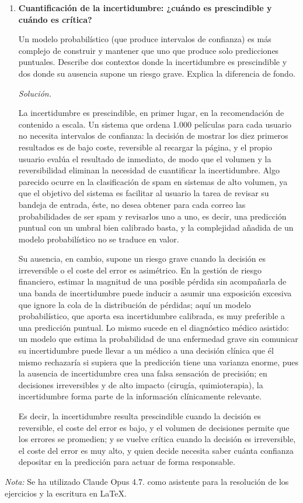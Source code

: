 \documentclass[12pt]{article}
\newcommand\sol[1]{\begin{mdframed}
\emph{Solución.} #1
\end{mdframed}}
\begin{document}
\begin{enumerate}
\item \textbf{Cuantificación de la incertidumbre: ¿cuándo es prescindible y cuándo es crítica?}

Un modelo probabilístico (que produce intervalos de confianza) es más complejo de construir y
mantener que uno que produce solo predicciones puntuales. Describe dos contextos donde la
incertidumbre es prescindible y dos donde su ausencia supone un riesgo grave. Explica la diferencia
de fondo.

\sol{

La incertidumbre es prescindible, en primer lugar, en la recomendación de contenido a escala. Un
sistema que ordena 1.000 películas para cada usuario no necesita intervalos de confianza: la decisión
de mostrar los diez primeros resultados es de bajo coste, reversible al recargar la página, y el
propio usuario evalúa el resultado de inmediato, de modo que el volumen y la reversibilidad eliminan
la necesidad de cuantificar la incertidumbre. Algo parecido ocurre en la clasificación de spam en
sistemas de alto volumen, ya que el objetivo del sistema es facilitar al usuario la tarea de revisar su bandeja de entrada, éste, no desea obtener para cada correo las probabilidades de ser spam y revisarlos uno a uno, es decir, una predicción puntual con un umbral bien calibrado basta, y la complejidad añadida de un modelo probabilístico no se traduce
en valor.

\medskip
Su ausencia, en cambio, supone un riesgo grave cuando la decisión es irreversible o el coste del error
es asimétrico. En la gestión de riesgo financiero, estimar la magnitud de una posible pérdida sin
acompañarla de una banda de incertidumbre puede inducir a asumir una exposición excesiva que ignore la
cola de la distribución de pérdidas; aquí un modelo probabilístico, que aporta esa incertidumbre
calibrada, es muy preferible a una predicción puntual. Lo mismo sucede en el diagnóstico médico
asistido: un modelo que estima la probabilidad de una enfermedad grave sin comunicar su incertidumbre
puede llevar a un médico a una decisión clínica que él mismo rechazaría si supiera que la predicción
tiene una varianza enorme, pues la ausencia de incertidumbre crea una falsa sensación de precisión; en
decisiones irreversibles y de alto impacto (cirugía, quimioterapia), la incertidumbre forma parte de
la información clínicamente relevante.

\medskip
Es decir, la incertidumbre resulta prescindible cuando la decisión es reversible, el coste del
error es bajo, y el volumen de decisiones permite que los errores se promedien; y se
vuelve crítica cuando la decisión es irreversible, el coste del error es muy alto, y
quien decide necesita saber cuánta confianza depositar en la predicción para actuar de forma
responsable.
}

\end{enumerate}

\noindent \textit{Nota:} Se ha utilizado Claude Opus 4.7. como asistente para la resolución de los ejercicios y la escritura en \LaTeX.
\end{document}
